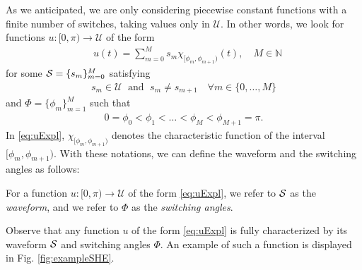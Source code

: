 \documentclass[twocolumn]{autart}    %
\begin{document}
As we anticipated,  we are only considering piecewise constant functions with a finite number of switches, taking values only in $\mathcal{U}$.
In other words, we look for functions $u: [0,\pi)\to \mathcal{U}$ of the form
\begin{align}\label{eq:uExpl}
	&u (t)= \sum_{m=0}^M s_m\chi_{[\phi_m,\phi_{m+1})} (t), \quad M\in\mathbb{N} 
\end{align}
for some $\mathcal{S} = \{ s_m\}_{m=0}^M$ satisfying
\begin{align*}
	s_m\in \mathcal{U} \; \text{ and } \; s_m\neq s_{m+1} \quad \forall m\in \{0,\ldots, M\}
\end{align*}
and $\Phi = \{ \phi_m\}_{m=1}^{M}$ such that
\begin{align*}
	0= \phi_0 < \phi_1 <\ldots < \phi_M < \phi_{M+1} = \pi .
\end{align*}
In \eqref{eq:uExpl}, $\chi_{[\phi_m,\phi_{m+1})}$ denotes the characteristic function of the interval $[\phi_m,\phi_{m+1})$. With these notations, we can  define the waveform and the switching angles as follows:

\bigskip

\begin{definition}\label{def: waveform and switching angles}
For a function $u: [0,\pi) \to \mathcal{U}$ of the form \eqref{eq:uExpl}, we refer to $\mathcal{S}$ as the \emph{waveform}, and we refer to $\Phi$ as the \emph{switching angles}.
\end{definition}

Observe that any function $u$ of the form \eqref{eq:uExpl} is fully characterized by its waveform $\mathcal{S}$ and switching angles $\Phi$. An example of such a function is displayed in Fig. \ref{fig:exampleSHE}. 
\end{document}
